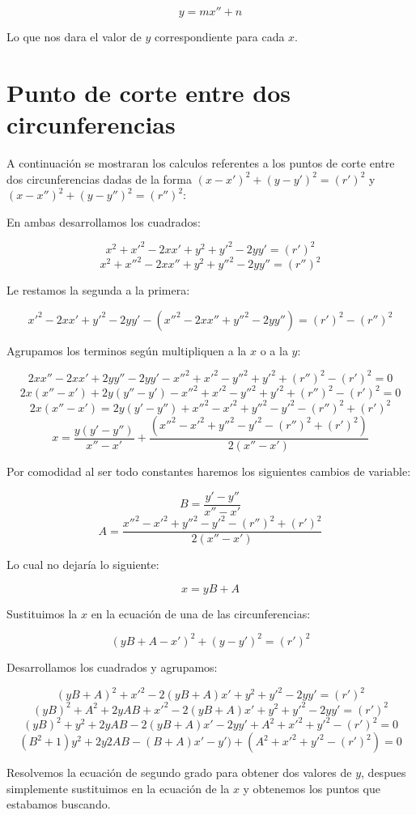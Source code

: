 $$y = mx'' + n$$

Lo que nos dara el valor de $y$ correspondiente para cada $x$.\par

\section{Punto de corte entre dos circunferencias}

A continuación se mostraran los calculos referentes a los puntos de corte entre dos circunferencias dadas de la forma $(x-x')^2 + (y -y')^2 = (r')^2$ y $(x-x'')^2 + (y -y'')^2 = (r'')^2$: \par

En ambas desarrollamos los cuadrados:\par

$$x^2 + x'^2 - 2xx' + y^2 + y'^2 - 2yy' = (r')^2$$
$$x^2 + x''^2 - 2xx'' + y^2 + y''^2 - 2yy'' = (r'')^2$$

Le restamos la segunda a la primera:\par

$$x'^2 - 2xx' + y'^2 - 2yy' -(x''^2 - 2xx'' + y''^2 - 2yy'') = (r')^2 - (r'')^2$$

Agrupamos los terminos según multipliquen a la $x$ o a la $y$:\par

$$ 2xx'' - 2xx' + 2yy'' - 2yy' - x''^2 + x'^2 - y''^2 + y'^2 + (r'')^2 - (r')^2 = 0$$
$$ 2x(x'' - x') + 2y(y'' - y') - x''^2 + x'^2 - y''^2 + y'^2 + (r'')^2 - (r')^2 = 0$$
$$ 2x(x'' - x') = 2y(y' - y'') + x''^2 - x'^2 + y''^2 - y'^2 - (r'')^2 + (r')^2 $$
$$ x =\frac{y(y' - y'')}{x'' - x'} + \frac{(x''^2 - x'^2 + y''^2 - y'^2 - (r'')^2 + (r')^2)}{2(x'' - x')} $$

Por comodidad al ser todo constantes haremos los siguientes cambios de variable:\par

$$B = \frac{y' - y''}{x'' - x'}$$
$$A = \frac{x''^2 - x'^2 + y''^2 - y'^2 - (r'')^2 + (r')^2}{2(x'' - x')}$$

Lo cual no dejaría lo siguiente:\par

$$ x = yB + A$$

Sustituimos la $x$ en la ecuación de una de las circunferencias:\par

$$(yB + A-x')^2 + (y -y')^2 = (r')^2$$

Desarrollamos los cuadrados y agrupamos:\par

$$(yB + A)^2 + x'^2 - 2(yB + A)x' + y^2 + y'^2 - 2yy' = (r')^2$$
$$ (yB)^2 + A^2 + 2yAB + x'^2 - 2(yB + A)x' + y^2 + y'^2 - 2yy' = (r')^2$$
$$ (yB)^2 + y^2 + 2yAB - 2(yB + A)x' - 2yy' + A^2 + x'^2 + y'^2 - (r')^2 = 0$$
$$ (B^2 + 1)y^2 + 2y2AB - (B + A)x' - y') + (A^2 + x'^2 + y'^2 - (r')^2) = 0$$

Resolvemos la ecuación de segundo grado para obtener dos valores de $y$, despues simplemente sustituimos en la ecuación de la $x$ y obtenemos los puntos que estabamos buscando.\par
